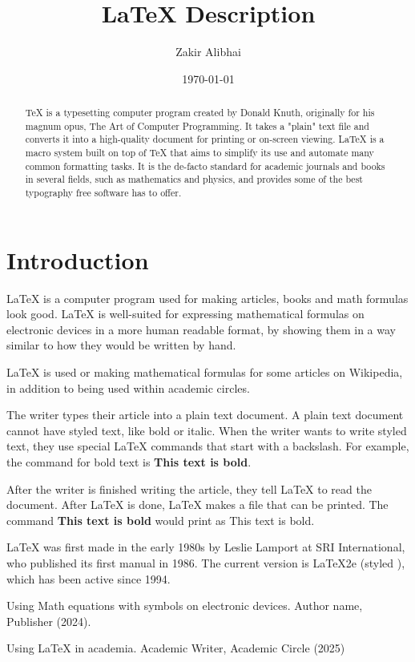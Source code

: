 \documentclass[letterpaper,notitlepage,11pt]{article}
\begin{document}
\title{LaTeX Description}
\author{Zakir Alibhai}
\date{\today}
\maketitle
\begin{abstract}
TeX is a typesetting computer program created by Donald Knuth, originally for his magnum opus, The Art of Computer Programming. It takes a "plain" text file and converts it into a high-quality document for printing or on-screen viewing. LaTeX is a macro system built on top of TeX that aims to simplify its use and automate many common formatting tasks. It is the de-facto standard for academic journals and books in several fields, such as mathematics and physics, and provides some of the best typography free software has to offer.
\end{abstract}
\section{Introduction}
LaTeX is a computer program used for making articles, books and math formulas look good. LaTeX is well-suited for expressing mathematical formulas on electronic devices\cite{math} in a more human readable format, by showing them in a way similar to how they would be written by hand.

LaTeX is used or making mathematical formulas for some articles on Wikipedia, in addition to being used within academic circles\cite{academia}.

The writer types their article into a plain text document. A plain text document cannot have styled text, like bold or italic. When the writer wants to write styled text, they use special LaTeX commands\cite{peter} that start with a backslash. For example, the command for bold text is \textbf{This text is bold}.

After the writer is finished writing the article, they tell LaTeX to read the document. After LaTeX is done, LaTeX makes a file that can be printed. The command \textbf{This text is bold} would print as This text is bold.

LaTeX was first made in the early 1980s by Leslie Lamport at SRI International, who published its first manual in 1986. The current version is LaTeX2e (styled \LaTeXe), which has been active since 1994.

\begin{thebibliography}{99}

Using Math equations with symbols on electronic devices. Author name, Publisher (2024).

Using LaTeX in academia. Academic Writer, Academic Circle (2025)

\end{thebibliography}
\end{document}
